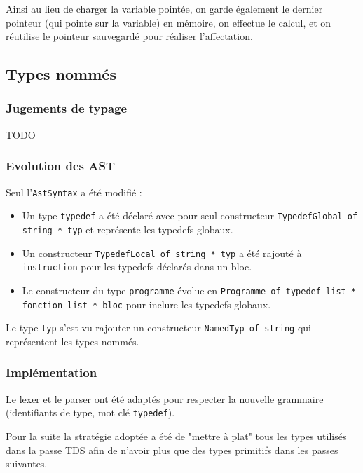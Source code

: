 \documentclass[headings=standardclasses,parskip=half]{scrartcl}
\begin{document}
Ainsi au lieu de charger la variable pointée,
on garde également le dernier pointeur (qui pointe sur la variable)
en mémoire, on effectue le calcul, et on réutilise
le pointeur sauvegardé pour réaliser l'affectation.

\subsection{Types nommés}

\subsubsection*{Jugements de typage}

TODO

\subsubsection*{Evolution des AST}

Seul l'\texttt{AstSyntax} a été modifié :

\begin{itemize}
    \item Un type \texttt{typedef} a été déclaré avec pour seul
          constructeur \texttt{TypedefGlobal of string * typ} et
          représente les typedefs globaux.
    \item Un constructeur \texttt{TypedefLocal of string * typ} a
          été rajouté à \texttt{instruction} pour les typedefs
          déclarés dans un bloc.
    \item Le constructeur du type \texttt{programme} évolue en
          \texttt{Programme of typedef list * fonction list * bloc}
          pour inclure les typedefs globaux.
\end{itemize}

Le type \texttt{typ} s'est vu rajouter un constructeur
\texttt{NamedTyp of string} qui représentent les types nommés.

\subsubsection*{Implémentation}

Le lexer et le parser ont été adaptés pour respecter la nouvelle
grammaire (identifiants de type, mot clé \texttt{typedef}).

Pour la suite la stratégie adoptée a été de "mettre à plat" tous les
types utilisés dans la passe TDS afin de n'avoir plus que des types
primitifs dans les passes suivantes.
\end{document}
